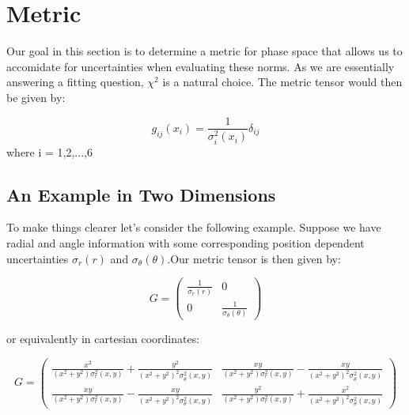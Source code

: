 \documentclass{article}
\begin{document}
\section{Metric}

Our goal in this section is to determine a metric for phase space that allows us to accomidate for uncertainties when evaluating these norms. As we are essentially answering a fitting question, $\chi^2$ is a natural choice. The metric tensor would then be given by:

\begin{equation}
 g_{ij}(x_i) =\frac{1}{\sigma_i^2(x_i)} \delta_{ij}
\end{equation}
 where i = 1,2,...,6

\subsection{An Example in Two Dimensions}

To make things clearer let's consider the following example. Suppose we have radial and angle information with some corresponding position dependent uncertainties $\sigma_r(r)$ and $\sigma_\theta(\theta)$.Our metric tensor is then given by:

\begin{equation}
G = \left( \begin{array}{cc}
\frac{1}{\sigma_r(r)} & 0 \\
0 & \frac{1}{\sigma_\theta(\theta)} 
\end{array}
\right)
\end{equation}

or equivalently in cartesian coordinates:

\begin{equation}
G = \left( \begin{array}{cc}
\frac{x^2}{(x^2+y^2)\sigma_r^2(x,y)} + \frac{y^2}{(x^2+y^2)^2\sigma_\theta^2(x,y)} & \frac{xy}{(x^2+y^2)\sigma^2_r(x,y)} -\frac{xy}{(x^2+y^2)^2\sigma_\theta^2(x,y)} \\
\frac{xy}{(x^2+y^2)\sigma^2_r(x,y)} -\frac{xy}{(x^2+y^2)^2\sigma_\theta^2(x,y)} & \frac{y^2}{(x^2+y^2)\sigma_r^2(x,y)} + \frac{x^2}{(x^2+y^2)^2\sigma_\theta^2(x,y)}
\end{array}
\right)
\end{equation}  
\end{document}
